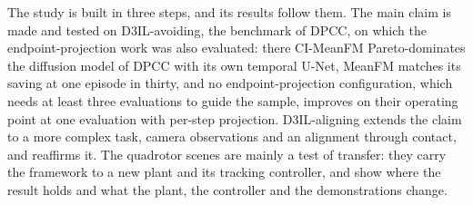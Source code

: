 The study is built in three steps, and its results follow them. The main claim is made and tested on
D3IL-avoiding, the benchmark of \ac{DPCC}, on which the endpoint-projection work was also evaluated: there
CI-MeanFM Pareto-dominates the diffusion model of \ac{DPCC} with its own temporal U-Net, MeanFM matches its
saving at one episode in thirty, and no
endpoint-projection configuration, which needs at least three evaluations to guide the sample, improves on their
operating point at one evaluation with per-step projection. D3IL-aligning extends the claim to a more complex
task, camera observations and an alignment through contact, and reaffirms it. The quadrotor scenes are mainly a
test of transfer: they carry the framework to a new plant and its tracking controller, and show where the result
holds and what the plant, the controller and the demonstrations change.


